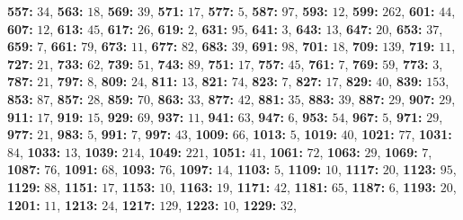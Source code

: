 \textsf{\bfseries 557:} $34$, \textsf{\bfseries 563:} $18$, \textsf{\bfseries 569:} $39$, \textsf{\bfseries 571:} $17$, \textsf{\bfseries 577:} $5$, \textsf{\bfseries 587:} $97$, \textsf{\bfseries 593:} $12$, \textsf{\bfseries 599:} $262$, \textsf{\bfseries 601:} $44$, \textsf{\bfseries 607:} $12$, \textsf{\bfseries 613:} $45$, \textsf{\bfseries 617:} $26$, \textsf{\bfseries 619:} $2$, \textsf{\bfseries 631:} $95$, \textsf{\bfseries 641:} $3$, \textsf{\bfseries 643:} $13$, \textsf{\bfseries 647:} $20$, \textsf{\bfseries 653:} $37$, \textsf{\bfseries 659:} $7$, \textsf{\bfseries 661:} $79$, \textsf{\bfseries 673:} $11$, \textsf{\bfseries 677:} $82$, \textsf{\bfseries 683:} $39$, \textsf{\bfseries 691:} $98$, \textsf{\bfseries 701:} $18$, \textsf{\bfseries 709:} $139$, \textsf{\bfseries 719:} $11$, \textsf{\bfseries 727:} $21$, \textsf{\bfseries 733:} $62$, \textsf{\bfseries 739:} $51$, \textsf{\bfseries 743:} $89$, \textsf{\bfseries 751:} $17$, \textsf{\bfseries 757:} $45$, \textsf{\bfseries 761:} $7$, \textsf{\bfseries 769:} $59$, \textsf{\bfseries 773:} $3$, \textsf{\bfseries 787:} $21$, \textsf{\bfseries 797:} $8$, \textsf{\bfseries 809:} $24$, \textsf{\bfseries 811:} $13$, \textsf{\bfseries 821:} $74$, \textsf{\bfseries 823:} $7$, \textsf{\bfseries 827:} $17$, \textsf{\bfseries 829:} $40$, \textsf{\bfseries 839:} $153$, \textsf{\bfseries 853:} $87$, \textsf{\bfseries 857:} $28$, \textsf{\bfseries 859:} $70$, \textsf{\bfseries 863:} $33$, \textsf{\bfseries 877:} $42$, \textsf{\bfseries 881:} $35$, \textsf{\bfseries 883:} $39$, \textsf{\bfseries 887:} $29$, \textsf{\bfseries 907:} $29$, \textsf{\bfseries 911:} $17$, \textsf{\bfseries 919:} $15$, \textsf{\bfseries 929:} $69$, \textsf{\bfseries 937:} $11$, \textsf{\bfseries 941:} $63$, \textsf{\bfseries 947:} $6$, \textsf{\bfseries 953:} $54$, \textsf{\bfseries 967:} $5$, \textsf{\bfseries 971:} $29$, \textsf{\bfseries 977:} $21$, \textsf{\bfseries 983:} $5$, \textsf{\bfseries 991:} $7$, \textsf{\bfseries 997:} $43$, \textsf{\bfseries 1009:} $66$, \textsf{\bfseries 1013:} $5$, \textsf{\bfseries 1019:} $40$, \textsf{\bfseries 1021:} $77$, \textsf{\bfseries 1031:} $84$, \textsf{\bfseries 1033:} $13$, \textsf{\bfseries 1039:} $214$, \textsf{\bfseries 1049:} $221$, \textsf{\bfseries 1051:} $41$, \textsf{\bfseries 1061:} $72$, \textsf{\bfseries 1063:} $29$, \textsf{\bfseries 1069:} $7$, \textsf{\bfseries 1087:} $76$, \textsf{\bfseries 1091:} $68$, \textsf{\bfseries 1093:} $76$, \textsf{\bfseries 1097:} $14$, \textsf{\bfseries 1103:} $5$, \textsf{\bfseries 1109:} $10$, \textsf{\bfseries 1117:} $20$, \textsf{\bfseries 1123:} $95$, \textsf{\bfseries 1129:} $88$, \textsf{\bfseries 1151:} $17$, \textsf{\bfseries 1153:} $10$, \textsf{\bfseries 1163:} $19$, \textsf{\bfseries 1171:} $42$, \textsf{\bfseries 1181:} $65$, \textsf{\bfseries 1187:} $6$, \textsf{\bfseries 1193:} $20$, \textsf{\bfseries 1201:} $11$, \textsf{\bfseries 1213:} $24$, \textsf{\bfseries 1217:} $129$, \textsf{\bfseries 1223:} $10$, \textsf{\bfseries 1229:} $32$, 
